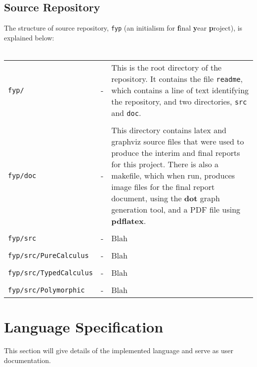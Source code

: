 \documentclass{article}
\begin{document}
\subsection{Source Repository}
The structure of source repository, \texttt{fyp} (an initialism for \textbf{f}inal \textbf{y}ear \textbf{p}roject), is explained below:
\\\\
\begin{tabular}{ p{37mm} p{2mm} p{70mm} }
    \texttt{fyp/}                  & - & This is the root directory of the repository. It contains the file \texttt{readme}, which contains a line of text identifying the repository, and two directories, \texttt{src} and \texttt{doc}. \\
                                   &   & \\
    \texttt{fyp/doc}               & - & This directory contains latex and graphviz source files that were used to produce the interim and final reports for this project. There is also a makefile, which when run, produces image files for the final report document, using the \textbf{dot} graph generation tool, and a PDF file using \textbf{pdflatex}. \\
                                   &   & \\
    \texttt{fyp/src}               & - & Blah\\
                                   &   & \\
    \texttt{fyp/src/PureCalculus}  & - & Blah\\
                                   &   & \\
    \texttt{fyp/src/TypedCalculus} & - & Blah\\
                                   &   & \\
    \texttt{fyp/src/Polymorphic}   & - & Blah\\
\end{tabular}

\pagebreak
\section{Language Specification}
This section will give details of the implemented language and serve as user documentation.
\end{document}
